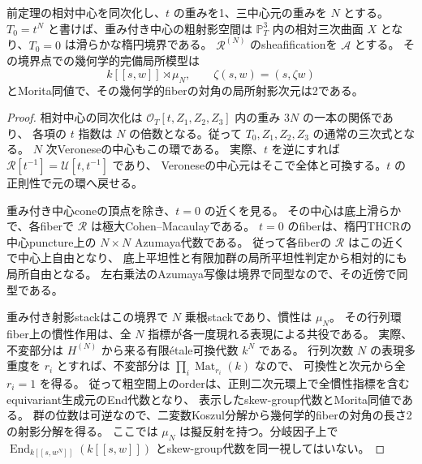 \begin{lemma}[射影中心の無限遠での一様な正則局所模型]
\label{lem:finite-order-boundary-order}
前定理の相対中心を同次化し、$t$ の重みを1、三中心元の重みを $N$ とする。
$T_0=t^N$ と書けば、重み付き中心の粗射影空間は
$\mathbb P^3_T$ 内の相対三次曲面 $X$ となり、$T_0=0$ は滑らかな楕円境界である。
$\mathcal R^{(N)}$ のsheafificationを $\mathcal A$ とする。
その境界点での幾何学的完備局所模型は
\[
 k[[s,w]]\rtimes\mu_N,\qquad
 \zeta(s,w)=(s,\zeta w)
\]
とMorita同値で、その幾何学的fiberの対角の局所射影次元は2である。
\end{lemma}
\begin{proof}
相対中心の同次化は $\mathcal O_T[t,Z_1,Z_2,Z_3]$ 内の重み $3N$ の一本の関係であり、
各項の $t$ 指数は $N$ の倍数となる。従って $T_0,Z_1,Z_2,Z_3$ の通常の三次式となる。
$N$ 次Veroneseの中心もこの環である。
実際、$t$ を逆にすれば $\mathcal R[t^{-1}]=\mathcal U[t,t^{-1}]$ であり、
Veroneseの中心元はそこで全体と可換する。$t$ の正則性で元の環へ戻せる。

重み付き中心coneの頂点を除き、$t=0$ の近くを見る。
その中心は底上滑らかで、各fiberで $\mathcal R$ は極大Cohen--Macaulayである。
$t=0$ のfiberは、楕円THCRの中心puncture上の $N\times N$ Azumaya代数である。
従って各fiberの $\mathcal R$ はこの近くで中心上自由となり、
底上平坦性と有限加群の局所平坦性判定から相対的にも局所自由となる。
左右乗法のAzumaya写像は境界で同型なので、その近傍で同型である。

重み付き射影stackはこの境界で $N$ 乗根stackであり、慣性は $\mu_N$。
その行列環fiber上の慣性作用は、全 $N$ 指標が各一度現れる表現による共役である。
実際、不変部分は $H^{(N)}$ から来る有限\'{e}tale可換代数 $k^N$ である。
行列次数 $N$ の表現多重度を $r_i$ とすれば、不変部分は $\prod_i\operatorname{Mat}_{r_i}(k)$ なので、
可換性と次元から全 $r_i=1$ を得る。
従って粗空間上のorderは、正則二次元環上で全慣性指標を含むequivariant生成元のEnd代数となり、
表示したskew-group代数とMorita同値である。
群の位数は可逆なので、二変数Koszul分解から幾何学的fiberの対角の長さ2の射影分解を得る。
ここでは $\mu_N$ は擬反射を持つ。分岐因子上で
$\operatorname{End}_{k[[s,w^N]]}(k[[s,w]])$ とskew-group代数を同一視してはいない。
\end{proof}


